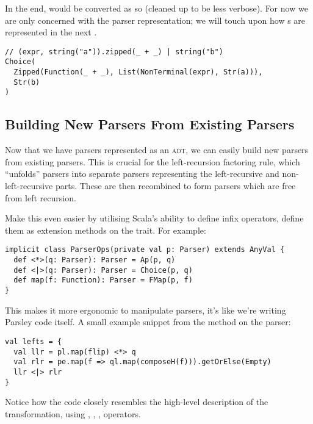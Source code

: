 \documentclass[../../main.tex]{subfiles}
\begin{document}
In the end,  would be converted as so (cleaned up to be less verbose).
For now we are only concerned with the parser representation; we will touch upon how s are represented in the next .
\begin{verbatim}
// (expr, string("a")).zipped(_ + _) | string("b")
Choice(
  Zipped(Function(_ + _), List(NonTerminal(expr), Str(a))),
  Str(b)
)
\end{verbatim}

\subsection{Building New Parsers From Existing Parsers}
Now that we have parsers represented as an \textsc{adt}, we can easily build new parsers from existing parsers.
This is crucial for the left-recursion factoring rule, which ``unfolds'' parsers into separate parsers representing the left-recursive and non-left-recursive parts.
These are then recombined to form parsers which are free from left recursion.

Make this even easier by utilising Scala's ability to define infix operators, define them as extension methods on the  trait.
For example:
\begin{verbatim}
implicit class ParserOps(private val p: Parser) extends AnyVal {
  def <*>(q: Parser): Parser = Ap(p, q)
  def <|>(q: Parser): Parser = Choice(p, q)
  def map(f: Function): Parser = FMap(p, f)
}
\end{verbatim}
%
This makes it more ergonomic to manipulate parsers, it's like we're writing Parsley code itself.
A small example snippet from the  method on the  parser:
\begin{verbatim}
val lefts = {
  val llr = pl.map(flip) <*> q
  val rlr = pe.map(f => ql.map(composeH(f))).getOrElse(Empty)
  llr <|> rlr
}
\end{verbatim}
Notice how the code closely resembles the high-level description of the transformation, using \scala{<*>}, \scala{<|>}, , operators.
\end{document}
